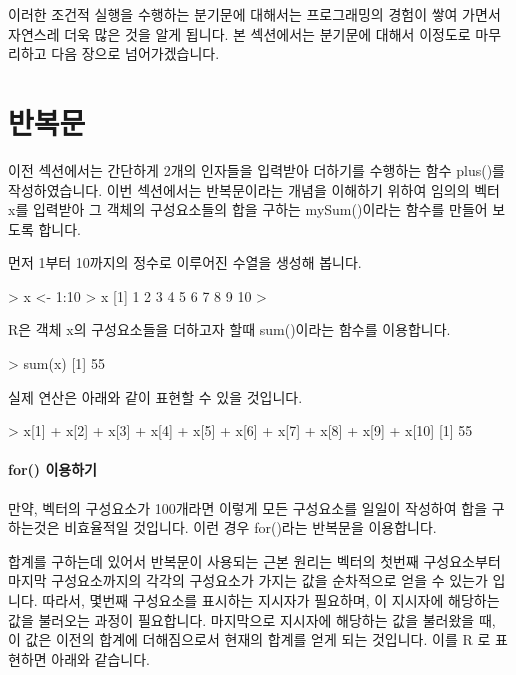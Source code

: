 이러한 조건적 실행을 수행하는 분기문에 대해서는 프로그래밍의 경험이 쌓여 가면서 자연스레 더욱 많은 것을 알게 됩니다. 
본 섹션에서는 분기문에 대해서 이정도로 마무리하고 다음 장으로 넘어가겠습니다. 


\section{반복문}

이전 섹션에서는 간단하게 2개의 인자들을 입력받아 더하기를 수행하는 함수 plus()를 작성하였습니다.
이번 섹션에서는 반복문이라는 개념을 이해하기 위하여 임의의 벡터 x를 입력받아 그 객체의 구성요소들의 합을 구하는 mySum()이라는 함수를 만들어 보도록 합니다. 

먼저 1부터 10까지의 정수로 이루어진 수열을 생성해 봅니다.

\begin{Schunk}
\begin{Soutput}
> x <- 1:10
> x
 [1]  1  2  3  4  5  6  7  8  9 10
> 
\end{Soutput}
\end{Schunk}

R은 객체 x의 구성요소들을 더하고자 할때 sum()이라는 함수를 이용합니다.

\begin{Schunk}
\begin{Soutput}
> sum(x)
[1] 55
\end{Soutput}
\end{Schunk}

실제 연산은 아래와 같이 표현할 수 있을 것입니다.

\begin{Schunk}
\begin{Soutput}
> x[1] + x[2] + x[3] + x[4] + x[5] + x[6] + x[7] + x[8] + x[9] + x[10]
[1] 55
\end{Soutput}
\end{Schunk}

\paragraph{for() 이용하기}

만약, 벡터의 구성요소가 100개라면 이렇게 모든 구성요소를 일일이 작성하여 합을 구하는것은 비효율적일 것입니다. 
이런 경우 for()라는 반복문을 이용합니다. 

합계를 구하는데 있어서 반복문이 사용되는 근본 원리는 벡터의 첫번째 구성요소부터 마지막 구성요소까지의 각각의 구성요소가 가지는 값을 순차적으로 얻을 수 있는가 입니다.
따라서, 몇번째 구성요소를 표시하는 지시자가 필요하며, 이 지시자에 해당하는 값을 불러오는 과정이 필요합니다.
마지막으로 지시자에 해당하는 값을 불러왔을 때, 이 값은 이전의 합계에 더해짐으로서 현재의 합계를 얻게 되는 것입니다.
이를 R 로 표현하면 아래와 같습니다. 

